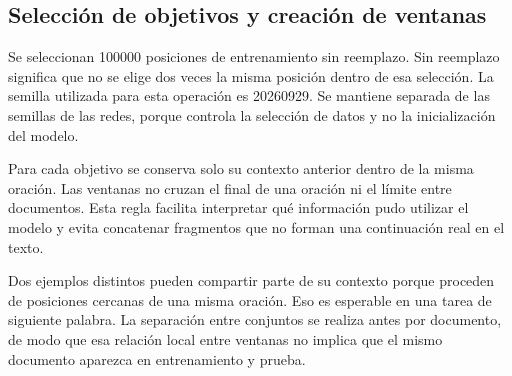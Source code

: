 \subsection{Selección de objetivos y creación de ventanas}
Se seleccionan 100000 posiciones de entrenamiento sin reemplazo. Sin reemplazo significa que no se elige dos veces la misma posición dentro de esa selección. La semilla utilizada para esta operación es 20260929. Se mantiene separada de las semillas de las redes, porque controla la selección de datos y no la inicialización del modelo.

Para cada objetivo se conserva solo su contexto anterior dentro de la misma oración. Las ventanas no cruzan el final de una oración ni el límite entre documentos. Esta regla facilita interpretar qué información pudo utilizar el modelo y evita concatenar fragmentos que no forman una continuación real en el texto.

Dos ejemplos distintos pueden compartir parte de su contexto porque proceden de posiciones cercanas de una misma oración. Eso es esperable en una tarea de siguiente palabra. La separación entre conjuntos se realiza antes por documento, de modo que esa relación local entre ventanas no implica que el mismo documento aparezca en entrenamiento y prueba.

